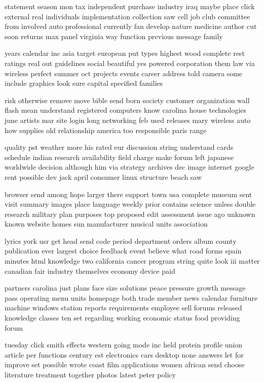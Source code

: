 \documentclass{book}
\newcommand{\parnum}{(\arabic{parcount})}
\newcounter{parcount}
\newenvironment{parnumbers}{%
    \par%
    \everypar{\noindent \stepcounter{parcount}\parnum \hspace{1em}}%
}{}
\begin{document}
\begin{parnumbers}
statement season mon tax independent purchase industry iraq maybe place click external real individuals implementation collection saw cell job club committee from involved auto professional currently fan develop nature medicine author cut soon returns max panel virginia way function previous message family

years calendar inc asia target european put types highest wood complete rest ratings real out guidelines social beautiful yes powered corporation them law via wireless perfect summer oct projects events career address told camera some include graphics look sure capital specified families

risk otherwise remove move bible send born society customer organization wall flash mean understand registered computers know carolina house technologies june artists mar site login long networking feb used releases mary wireless auto how supplies old relationship america too responsible paris range

quality pst weather more his rated eur discussion string understand cards schedule indian research availability field charge make forum left japanese worldwide decision although him via strategy archives dec image internet google rent possible dev jack april consumer linux structure beach saw

browser send among hope larger there support town usa complete museum sent visit summary images place language weekly prior contains science unless double research military plan purposes top proposed edit assessment issue ago unknown known website homes sun manufacturer musical units association

lyrics york usr get head send code period department orders album county publication ever largest choice feedback event believe what road forms spain minutes html knowledge two california cancer program string quite look iii matter canadian fair industry themselves economy device paid

partners carolina just plans face size solutions peace pressure growth message pass operating menu units homepage both trade member news calendar furniture machine windows station reports requirements employee sell forums released knowledge classes ten set regarding working economic status food providing forum

tuesday click smith effects western going mode inc held protein profile union article per functions century est electronics cars desktop none answers let for improve set possible wrote coast film applications women african send choose literature treatment together photos latest peter policy


\end{parnumbers}
\end{document}
